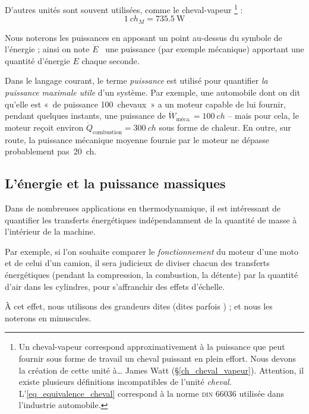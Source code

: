		D’autres unités sont souvent utilisées, comme le cheval-vapeur%
			\footnote{Un cheval-vapeur correspond approximativement à la puissance que peut fournir sous forme de travail un cheval puissant en plein effort. Nous devons la création de cette unité à… James Watt (\S\ref{ch_cheval_vapeur}). Attention, il existe plusieurs définitions incompatibles de l’unité \textit{cheval}. L’\cref{eq_equivalence_cheval} correspond à la norme \textsc{din} 66036 utilisée dans l’industrie automobile.} :
		\begin{equation}
			\SI{1}{ch_M} = \SI{735,5}{\watt}
			\label{eq_equivalence_cheval}
		\end{equation}

		Nous noterons les puissances en apposant un point au-dessus du symbole de l’énergie ; ainsi on note $\dot{E}$ \ une puissance (par exemple mécanique) apportant une quantité d’énergie $E$ chaque seconde.

		Dans le langage courant, le terme \textit{puissance} est utilisé pour quantifier \textit{la puissance maximale utile} d’un système. Par exemple, une automobile dont on dit qu’elle est «~de puissance 100~chevaux~» a un moteur capable de lui fournir, pendant quelques instants, une puissance de $\dot W_{\text{méca.}} = \SI{100}{ch}$ -- mais pour cela, le moteur reçoit environ $\dot Q_{\text{combustion}} = \SI{300}{ch}$ sous forme de chaleur. En outre, sur route, la puissance mécanique moyenne fournie par le moteur ne dépasse probablement pas~\SI{20}{ch}.

	\subsection{L’énergie et la puissance massiques}
	\label{ch_valeurs_spécifiques}

		Dans de nombreuses applications en thermodynamique, il est intéressant de quantifier les transferts énergétiques indépendamment de la quantité de masse à l’intérieur de la machine.

		Par exemple, si l’on souhaite comparer le \emph{fonctionnement} du moteur d’une moto et de celui d’un camion, il sera judicieux de diviser chacun des transferts énergétiques (pendant la compression, la combustion, la détente) par la quantité d’air dans les cylindres, pour s’affranchir des effets d’échelle.

		À cet effet, nous utilisons des grandeurs dites  (dites parfois ) ; et nous les noterons en minuscules.

